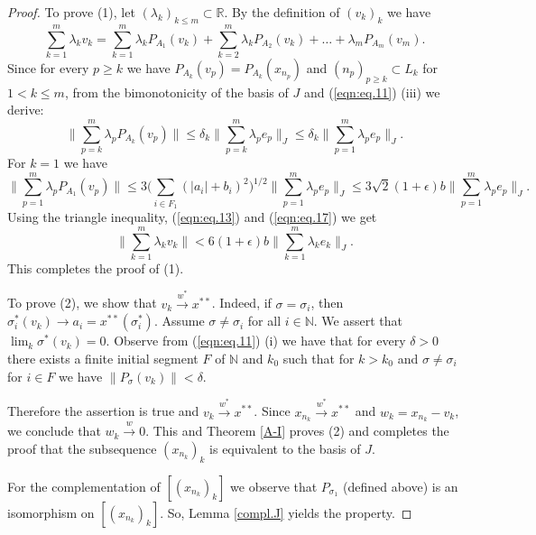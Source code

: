 \documentclass[12pt]{amsart}
\theoremstyle{plain}
\numberwithin{equation}{section}
\newcommand{\N}{\mathbb{N}}
\newcommand{\R}{\mathbb{R}}
\newcommand{\s}{\sigma}
\begin{document}
\begin{proof}
To prove (1), let $(\lambda_k)_{k\leq m} \subset \R$. By the definition of $(v_k)_k$ we have
\begin{equation}\label{eqn:eq.14}
\sum_{k=1}^m \lambda_k v_k = \sum_{k=1}^m \lambda_k P_{A_1}(v_k) + \sum_{k=2}^m \lambda_k P_{A_2}(v_k) + \dots + \lambda_m P_{A_m}(v_m).
\end{equation}
Since for every $p\geq k$ we have $P_{A_k}(v_p) = P_{A_k}(x_{n_p})$ and $(n_p)_{p\geq k} \subset L_k$ for $1 < k\leq m$, from the bimonotonicity of the basis of $J$ and (\ref{eqn:eq.11}) (iii) we derive:
\begin{equation}\label{eqn:eq.15}
\Big\| \sum_{p=k}^m \lambda_pP_{A_k}(v_p) \Big\| \leq \delta_k \Big\| \sum_{p=k}^m \lambda_p e_p \Big\|_J \leq \delta_k \Big\| \sum_{p=1}^m \lambda_p e_p \Big\|_J.
\end{equation}
For $k=1$ we have
\begin{equation}\label{eqn:eq.17}
\Big\| \sum_{p=1}^m \lambda_pP_{A_1}(v_p) \Big\| \leq 3\Big( \sum_{i\in F_1} (|a_i| + b_i)^2\Big)^{1/2} \Big\| \sum_{p=1}^m \lambda_p e_p \Big\|_J \leq 3\sqrt{2} (1+ \epsilon) b\Big\| \sum_{p=1}^m \lambda_p e_p \Big\|_J.
\end{equation}
Using the triangle inequality, (\ref{eqn:eq.13}) and (\ref{eqn:eq.17}) we get
\begin{equation}\label{eqn:eq.16}
\Big\|\sum_{k=1}^m \lambda_k v_k \Big\| < 6(1+\epsilon)b \Big\|\sum_{k=1}^m \lambda_k e_k \Big\|_J.
\end{equation}
This completes the proof of (1).

To prove (2), we show that $v_k \xrightarrow{w^*} x^{**}$. Indeed, if $\s = \s_i$, then $\s_i^*(v_k) \to a_i = x^{**}(\s_i^*)$. Assume $\s\neq \s_i$ for all $i \in \N$.
We assert that $\lim_k \s^*(v_k) = 0$. Observe from (\ref{eqn:eq.11}) (i) we have that for every $\delta > 0$ there exists a finite initial segment $F$ of $\N$ and $k_0$ such that for $k>k_0$ and $\s \neq \s_i$ for $i\in F$ we have $\| P_\s(v_k)\| < \delta$.

Therefore the assertion is true and $v_k \xrightarrow{w^*} x^{**}$.
Since $x_{n_k} \xrightarrow{w^*} x^{**}$ and $w_k = x_{n_k} - v_k$, we conclude that $w_k \xrightarrow{w} 0$. This and Theorem \ref{A-I} proves (2) and completes the proof that the subsequence $(x_{n_k})_k$ is equivalent to the basis of $J$.

For the complementation of $[(x_{n_k})_k]$ we observe that $P_{\s_1}$ (defined above) is an isomorphism on $[(x_{n_k})_k]$. So, Lemma \ref{compl.J} yields the property.
\end{proof}
\end{document}

